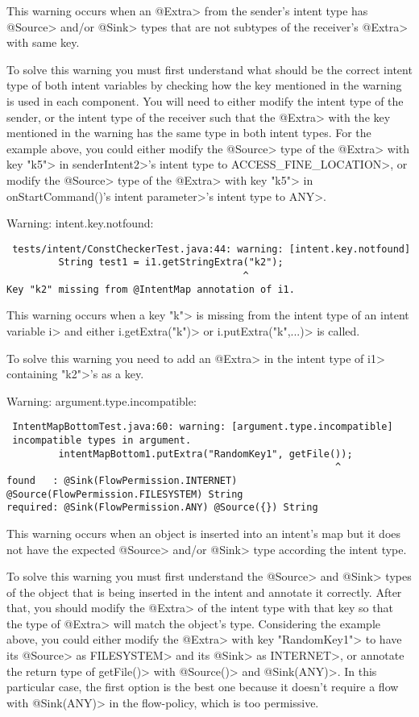 This warning occurs when an \<@Extra> from the sender's intent type has
\<@Source> and/or \<@Sink> types that are not subtypes of the receiver's
\<@Extra> with same key.

To solve this warning you must first understand what should be the correct
intent type of both intent variables by checking how the key mentioned in the
warning is used in each component. You will need to either modify the intent type of
the sender, or the intent type of the receiver such that the \<@Extra> with the
key mentioned in the warning has the same type in both intent types. For the
example above, you could either modify the \<@Source> type of the \<@Extra> with
key \<"k5"> in \<senderIntent2>'s intent type to \<ACCESS\_FINE\_LOCATION>, or
modify the \<@Source> type of the \<@Extra> with key \<"k5"> 
in \<onStartCommand()'s intent parameter>'s intent type to \<ANY>.

\bigskip
\noindent
Warning: intent.key.notfound:

\begin{Verbatim}
 tests/intent/ConstCheckerTest.java:44: warning: [intent.key.notfound] 
         String test1 = i1.getStringExtra("k2");
                                         ^
Key "k2" missing from @IntentMap annotation of i1.
\end{Verbatim}

This warning occurs when a key \<"k"> is missing from the intent
type of an intent variable \<i> and either \<i.getExtra("k")> or 
\<i.putExtra("k",...)> is called.

To solve this warning you need to add an \<@Extra> in the intent type of
\<i1> containing \<"k2">'s as a key.

\bigskip
\noindent
Warning: argument.type.incompatible:

\begin{Verbatim}
 IntentMapBottomTest.java:60: warning: [argument.type.incompatible] 
 incompatible types in argument.
         intentMapBottom1.putExtra("RandomKey1", getFile());
                                                         ^
found   : @Sink(FlowPermission.INTERNET) @Source(FlowPermission.FILESYSTEM) String
required: @Sink(FlowPermission.ANY) @Source({}) String
\end{Verbatim}

This warning occurs when an object is inserted into an intent's map but it
does not have the expected \<@Source> and/or \<@Sink> type according the
intent type.

To solve this warning you must first understand the \<@Source> and \<@Sink>
types of the object that is being inserted in the intent and annotate it
correctly. After that, you should modify the \<@Extra> of the
intent type with that key so that the type of \<@Extra> will match the object's
type. Considering the example above, you could either modify the \<@Extra> with
key \<"RandomKey1"> to have its \<@Source> as \<FILESYSTEM> and its \<@Sink> as
\<INTERNET>, or annotate the return type of
\<getFile()> with \<@Source({})> and \<@Sink(ANY)>.
In this particular case, the first option is the best one
because it doesn't require a flow with \<@Sink(ANY)> in the flow-policy, which
is too permissive.


